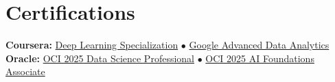 \documentclass[a4paper,10pt]{article}
\begin{document}
\section{Certifications}

\noindent\textbf{Coursera:} \href{https://coursera.org/share/218c9c7d0f22004848c2b9f7546901a5}{\color{darkblue}Deep Learning Specialization} $\bullet$ \href{https://coursera.org/share/218c9c7d0f22004848c2b9f7546901a5}{\color{darkblue}Google Advanced Data Analytics} \\ \textbf{Oracle:} \href{https://catalog-education.oracle.com/ords/certview/sharebadge?id=30F284CA7068AF4CACBE9B0909A33655D60B859E3E67A230D0BCCFD0F197FCB3}{\color{darkblue}OCI 2025 Data Science Professional} $\bullet$ \href{https://catalog-education.oracle.com/ords/certview/sharebadge?id=E4BE1CEE4B001665E4F0C2982D1DC4BC36F15FFD068FF4C62B8D3F2B8B10D661}{\color{darkblue}OCI 2025 AI Foundations Associate}
\end{document}
